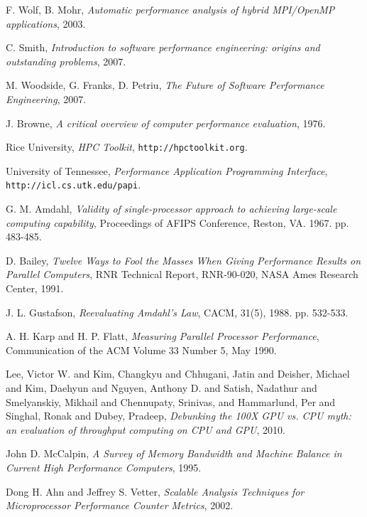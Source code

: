 \documentclass[a4paper]{report}
\begin{document}
\begin{thebibliography}{9}
  F. Wolf, B. Mohr,
  \emph{Automatic performance analysis of hybrid MPI/OpenMP applications},
  2003.
  
  C. Smith,
  \emph{Introduction to software performance engineering: origins and
    outstanding problems},
  2007.

  M. Woodside, G. Franks, D. Petriu,
  \emph{The Future of Software Performance Engineering},
  2007.

  J. Browne,
  \emph{A critical overview of computer performance evaluation},
  1976.

  Rice University,
  \emph{HPC Toolkit}, {\tt http://hpctoolkit.org}.
       
  University of Tennessee,
  \emph{Performance Application Programming Interface},
       {\tt http://icl.cs.utk.edu/papi}.
       
  G. M. Amdahl,
  \emph{Validity of single-processor approach to achieving large-scale
    computing capability},
  Proceedings of AFIPS Conference, Reston, VA. 1967. pp. 483-485.
  
  D. Bailey, \emph{Twelve Ways to Fool the Masses When Giving Performance
    Results on Parallel Computers},
  RNR Technical Report, RNR-90-020, NASA Ames Research Center, 1991.
  
  J. L. Gustafson,
  \emph{Reevaluating Amdahl's Law}, CACM, 31(5), 1988. pp. 532-533.
  
  A. H. Karp and H. P. Flatt,
  \emph{Measuring Parallel Processor Performance},
  Communication of the ACM Volume 33 Number 5, May 1990.
  
  {Lee, Victor W. and Kim, Changkyu and Chhugani, Jatin and Deisher, Michael
    and Kim, Daehyun and Nguyen, Anthony D. and Satish, Nadathur and
    Smelyanskiy, Mikhail and Chennupaty}, Srinivas, and Hammarlund, Per and
  Singhal, Ronak and Dubey, Pradeep,
  \emph{Debunking the 100X GPU vs. CPU myth: an evaluation of throughput
    computing on CPU and GPU},
  2010.
  
  John D. McCalpin,
  \emph{A Survey of Memory Bandwidth and Machine Balance in Current High
    Performance Computers},
  1995.
  
  Dong H. Ahn and Jeffrey S. Vetter,
  \emph{Scalable Analysis Techniques for Microprocessor Performance Counter
    Metrics},
  2002.
  

\end{thebibliography}
\end{document}
